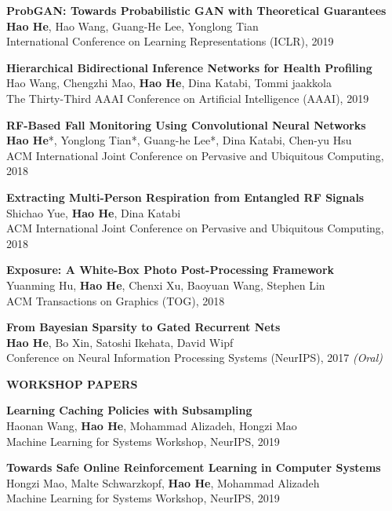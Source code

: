 \documentclass[margin]{res}
\begin{document}
\begin{resume}
\textbf{ProbGAN: Towards Probabilistic GAN with Theoretical Guarantees}\\
\textbf{Hao He}, Hao Wang, Guang-He Lee, Yonglong Tian\\
International Conference on Learning Representations (ICLR), 2019

\textbf{Hierarchical Bidirectional Inference Networks for Health Profiling}\\
Hao Wang, Chengzhi Mao, \textbf{Hao He}, Dina Katabi, Tommi jaakkola\\
The Thirty-Third AAAI Conference on Artificial Intelligence (AAAI), 2019

\textbf{RF-Based Fall Monitoring Using Convolutional Neural Networks}\\
\textbf{Hao He}*, Yonglong Tian*, Guang-he Lee*, Dina Katabi, Chen-yu Hsu\\
ACM International Joint Conference on Pervasive and Ubiquitous Computing, 2018

\textbf{Extracting Multi-Person Respiration from Entangled RF Signals}\\
Shichao Yue, \textbf{Hao He}, Dina Katabi \\
ACM International Joint Conference on Pervasive and Ubiquitous Computing, 2018

\textbf{Exposure: A White-Box Photo Post-Processing Framework}\\
Yuanming Hu, \textbf{Hao He}, Chenxi Xu, Baoyuan Wang, Stephen Lin\\
ACM Transactions on Graphics (TOG), 2018

\textbf{From Bayesian Sparsity to Gated Recurrent Nets}\\
\textbf{Hao He}, Bo Xin, Satoshi Ikehata, David Wipf\\
Conference on Neural Information Processing Systems (NeurIPS), 2017 \emph{(Oral)}

\textbf{WORKSHOP PAPERS}

\textbf{Learning Caching Policies with Subsampling}\\
Haonan Wang, \textbf{Hao He}, Mohammad Alizadeh, Hongzi Mao\\
Machine Learning for Systems Workshop, NeurIPS, 2019

\textbf{Towards Safe Online Reinforcement Learning in Computer Systems}\\
Hongzi Mao, Malte Schwarzkopf, \textbf{Hao He}, Mohammad Alizadeh\\
Machine Learning for Systems Workshop, NeurIPS, 2019



\end{resume}
\end{document}
